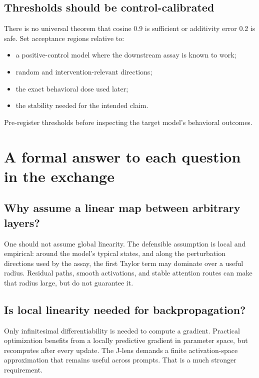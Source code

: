 \documentclass[11pt]{article}
\theoremstyle{definition}
\theoremstyle{remark}
\begin{document}
\subsection{Thresholds should be control-calibrated}
There is no universal theorem that cosine 0.9 is sufficient or additivity error 0.2 is safe. Set acceptance regions relative to:
\begin{itemize}
  \item a positive-control model where the downstream assay is known to work;
  \item random and intervention-relevant directions;
  \item the exact behavioral dose used later;
  \item the stability needed for the intended claim.
\end{itemize}
Pre-register thresholds before inspecting the target model's behavioral outcomes.

\section{A formal answer to each question in the exchange}

\subsection{Why assume a linear map between arbitrary layers?}
One should not assume global linearity. The defensible assumption is local and empirical: around the model's typical states, and along the perturbation directions used by the assay, the first Taylor term may dominate over a useful radius. Residual paths, smooth activations, and stable attention routes can make that radius large, but do not guarantee it.

\subsection{Is local linearity needed for backpropagation?}
Only infinitesimal differentiability is needed to compute a gradient. Practical optimization benefits from a locally predictive gradient in parameter space, but recomputes after every update. The J-lens demands a finite activation-space approximation that remains useful across prompts. That is a much stronger requirement.
\end{document}
